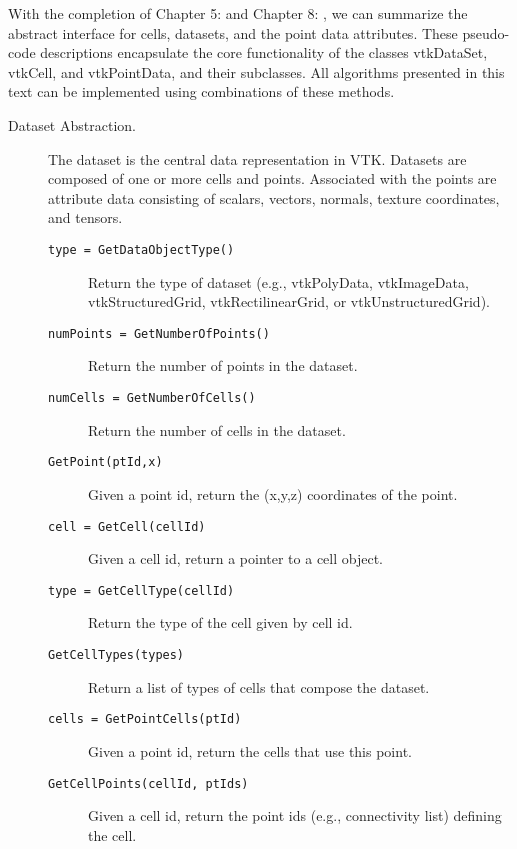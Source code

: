 With the completion of Chapter 5:  and Chapter 8: , we can summarize the abstract interface for cells, datasets, and the point data attributes. These pseudo-code descriptions encapsulate the core functionality of the classes vtkDataSet, vtkCell, and vtkPointData, and their subclasses. All algorithms presented in this text can be implemented using combinations of these methods.

\begin{description}
\item[Dataset Abstraction.] The dataset is the central data representation in VTK. Datasets are composed of one or more cells and points. Associated with the points are attribute data consisting of scalars, vectors, normals, texture coordinates, and tensors.
    \begin{description}

    \item[\texttt{type = GetDataObjectType()}]
    Return the type of dataset (e.g., vtkPolyData, vtkImageData, vtkStructuredGrid, vtkRectilinearGrid, or vtkUnstructuredGrid).

    \item[\texttt{numPoints = GetNumberOfPoints()}]
    Return the number of points in the dataset.

    \item[\texttt{numCells = GetNumberOfCells()}]
    Return the number of cells in the dataset.

    \item[\texttt{GetPoint(ptId,x)}]
    Given a point id, return the (x,y,z) coordinates of the point.

    \item[\texttt{cell = GetCell(cellId)}]
    Given a cell id, return a pointer to a cell object.

    \item[\texttt{type = GetCellType(cellId)}]
    Return the type of the cell given by cell id.

    \item[\texttt{GetCellTypes(types)}]
    Return a list of types of cells that compose the dataset.

    \item[\texttt{cells = GetPointCells(ptId)}]
    Given a point id, return the cells that use this point.

    \item[\texttt{GetCellPoints(cellId, ptIds)}]
    Given a cell id, return the point ids (e.g., connectivity list) defining the cell.


\end{description}
\end{description}
